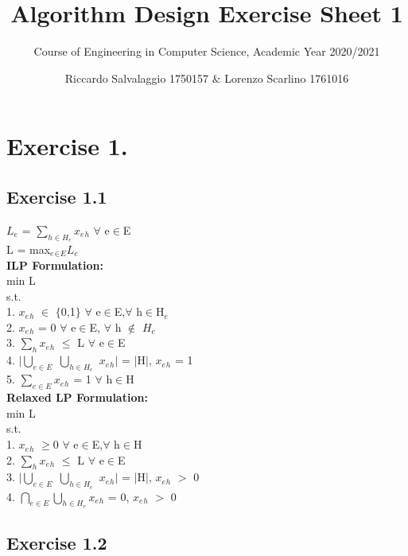 \documentclass[11pt]{scrartcl}
\title{Algorithm Design Exercise Sheet 1}
\author{Riccardo Salvalaggio 1750157 $\&$ Lorenzo Scarlino 1761016}
\subtitle{Course of Engineering in Computer Science, Academic Year 2020/2021}
\begin{document}
\maketitle

\begin{abstract}

\end{abstract}
\newpage
\section{Exercise 1.}
\subsection{Exercise 1.1}
$L_e$ = $\sum_{h \in H_e}x_e$$_h$ $\forall$ e$\in$E\\ 
L = max$_e$$_\in$$_E$$L_e$\\
\textbf{ILP Formulation:}\\
min L\\
s.t.\\
1. $x_e$$_h$ $\in$ $\{$0,1$\}$ $\forall$ e$\in$E,$\forall$ h$\in$H$_e$\\
2. $x_e$$_h$ = 0 $\forall$ e$\in$E, $\forall$ h $\notin$ $H_e$\\
3. $\sum_{h}x_e$$_h$ $\leq$ L $\forall$ e$\in$E\\
4. $|$$\bigcup_{e \in E}$ $\bigcup_{h \in H_e}$ $x_e$$_h$$|$ = $|$H$|$, $x_e$$_h$ = 1\\
5. $\sum_{e \in E} x_e$$_h$ = 1 $\forall$ h$\in$H\\
\textbf{Relaxed LP Formulation:}\\
min L\\
s.t.\\
1. $x_e$$_h$ $\geq 0$ $\forall$ e$\in$E,$\forall$ h$\in$H\\
2. $\sum_{h}x_e$$_h$ $\leq$ L $\forall$ e$\in$E\\
3. $|$$\bigcup_{e \in E}$ $\bigcup_{h \in H_e}$ $x_e$$_h$$|$ = $|$H$|$, $x_e$$_h$ $>$ 0\\
4. $\bigcap_{e \in E}$$\bigcup_{h \in H_e} x_e$$_h$ = 0, $x_e$$_h$ $>$ 0\\
\subsection{Exercise 1.2}
\vspace{-0.3cm}
\newpage
\end{document}
